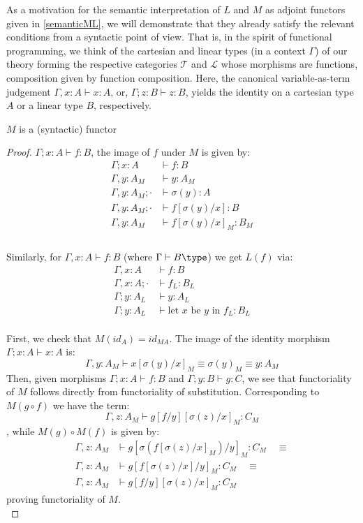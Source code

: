 As a motivation for the semantic interpretation of $L$ and $M$ as adjoint functors given in \ref{semanticML}, we will demonstrate that they already satisfy the relevant conditions from a syntactic point of view. That is, in the spirit of functional programming, we think of the cartesian and linear types (in a context $\Gamma$) of our theory forming the respective categories $\mathcal{T}$ and $\mathcal{L}$ whose morphisms are functions, composition given by function composition. Here, the canonical variable-as-term judgement $\Gamma, x : A \vdash x : A$, or, $\Gamma; z : B \vdash z : B$, yields the identity on a cartesian type $A$ or a linear type $B$, respectively.
\begin{thm}
  $M$ is a (syntactic) functor
  \begin{proof}
$\Gamma; x : A \vdash f : B$, the image of $f$ under $M$ is given by:\\
\[
  \begin{split}
  \Gamma; x : A &\vdash f : B\\
  \Gamma, y : A_M &\vdash y : A_M\\
  \Gamma, y : A_M; \cdot &\vdash \sigma(y) : A\\
  \Gamma, y : A_M; \cdot &\vdash f[\sigma(y)/x] : B\\
  \Gamma, y : A_M &\vdash f[\sigma(y)/x]_M : B_M\\
  \end{split}
\]\\
Similarly, for $\Gamma, x : A \vdash f : B$ (where $\Gamma \vdash B \type$) we get $L(f)$ via:
\[
  \begin{split}
    \Gamma, x : A &\vdash f : B\\
    \Gamma, x : A; \cdot &\vdash f_L : B_L\\
    \Gamma; y : A_L &\vdash y : A_L\\
    \Gamma; y : A_L &\vdash \text{let $x$ be $y$ in $f_L$} : B_L
  \end{split}
\]\\
First, we check that $M(id_A) = id_{MA}$.  The image of the identity morphism $\Gamma; x : A \vdash x : A$ is:
\[
  \Gamma, y : A_M \vdash x[\sigma(y)/x]_M \equiv \sigma(y)_M \equiv y : A_M
\]
Then, given morphisms $\Gamma; x : A \vdash f : B$ and $\Gamma; y : B \vdash g : C$, we see that functoriality of $M$ follows directly from functoriality of substitution. Corresponding to $M(g \circ f)$ we have the term:
\[
\Gamma, z : A_M \vdash g[f/y][\sigma(z)/x]_M : C_M
\],
while $M(g) \circ M(f)$ is given by:
\[
  \begin{split}
    \Gamma, z : A_M &\vdash g[\sigma(f[\sigma(z)/x]_M)/y]_M : C_M \quad \equiv\\
    \Gamma, z : A_M &\vdash g[f[\sigma(z)/x]/y]_M : C_M \quad \equiv\\
    \Gamma, z : A_M &\vdash g[f/y][\sigma(z)/x]_M : C_M
  \end{split}
\]
proving functoriality of $M$.\\
\end{proof}
\end{thm}
